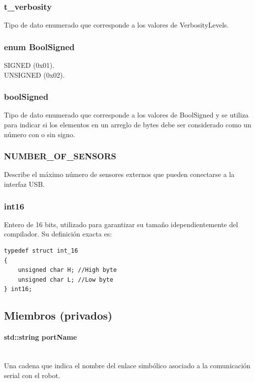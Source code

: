 \documentclass[letterpaper,openright,12pt]{book}
\begin{document}
\subsubsection{t\_verbosity}
Tipo de dato enumerado que corresponde a los valores de VerbosityLevels.\\

\subsubsection { enum BoolSigned}
SIGNED (0x01).\\
UNSIGNED (0x02).\\
\subsubsection{ boolSigned}
Tipo de dato enumerado que corresponde a los valores de BoolSigned y se utiliza para indicar si los elementos en un arreglo de bytes debe ser considerado como un número con o sin signo.\\

\subsubsection{ NUMBER\_OF\_SENSORS }
Describe el máximo número de sensores externos que pueden conectarse a la interfaz USB.\\

\subsubsection{int16}
Entero de 16 bits, utilizado para garantizar su tamaño idependientemente del compilador. Su definición exacta es:\\
\begin{lstlisting}
typedef struct int_16
{
	unsigned char H; //High byte
	unsigned char L; //Low byte
} int16;
\end{lstlisting}

\subsection{Miembros (privados)}
\paragraph{std::string portName}\mbox{}\\
Una cadena que indica el nombre del enlace simbólico asociado a la comunicación serial con el robot.
\end{document}
